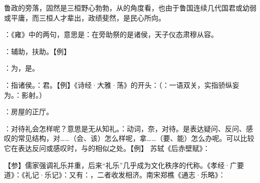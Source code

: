 {鲁政的旁落，固然是三桓野心勃勃，从的角度看，也由于鲁国连续几代国君或幼弱或平庸，而三桓人才辈出，政绩斐然，是民心所向。

\item {}：《雍》中的两句，意思是：在旁助祭的是诸侯，天子仪态肃穆从容。

：辅助，扶助。【例】 

：为，是。

：指诸侯。：君。【例】《诗经·大雅·荡》的开头：（：一语双关，实指骄纵妄为。：影射。）

\item {}：房屋的正厅。%
}
{}


{
\item {}：对待礼会怎样呢？意思是无从知礼。：动词，奈，对待。是表达疑问、反问、感叹的常见结构，对……（会、该）怎么样呢，拿……（要、能）怎么办呢。可以比较它在表达反问或感叹时，与的相似之处。【例】 苏轼《后赤壁赋》：

【参】儒家强调礼乐并重，后来“礼乐”几乎成为文化秩序的代称。《孝经·广要道》：《礼记·乐记》：又有：，二者收发相济。南宋郑樵《通志·乐略》：
}
{}



